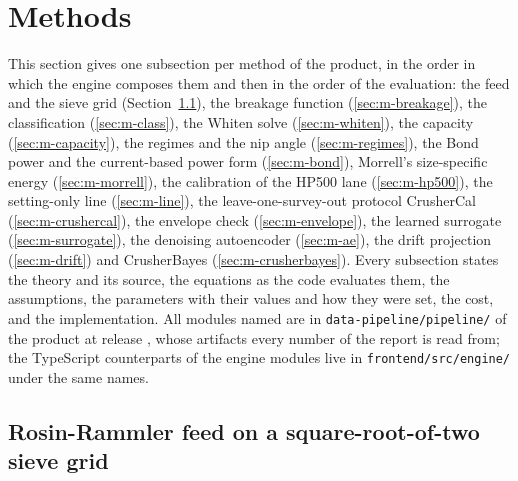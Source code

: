 \section{Methods}\label{sec:methods}

This section gives one subsection per method of the product, in the order in which the engine composes them and then in the order
of the evaluation: the feed and the sieve grid (Section~\ref{sec:m-feed}), the breakage function (\ref{sec:m-breakage}), the
classification (\ref{sec:m-class}), the Whiten solve (\ref{sec:m-whiten}), the capacity (\ref{sec:m-capacity}), the regimes and the
nip angle (\ref{sec:m-regimes}), the Bond power and the current-based power form (\ref{sec:m-bond}), Morrell's size-specific energy
(\ref{sec:m-morrell}), the calibration of the HP500 lane (\ref{sec:m-hp500}), the setting-only line (\ref{sec:m-line}), the
leave-one-survey-out protocol CrusherCal (\ref{sec:m-crushercal}), the envelope check (\ref{sec:m-envelope}), the learned surrogate
(\ref{sec:m-surrogate}), the denoising autoencoder (\ref{sec:m-ae}), the drift projection (\ref{sec:m-drift}) and CrusherBayes
(\ref{sec:m-crusherbayes}). Every subsection states the theory and its source, the equations as the code evaluates them, the
assumptions, the parameters with their values and how they were set, the cost, and the implementation. All modules named are in
\texttt{data-pipeline/\allowbreak{}pipeline/\allowbreak{}} of the product at release \docrelease, whose artifacts every number of the report is read from; the
TypeScript counterparts of the engine modules live in \texttt{frontend/\allowbreak{}src/\allowbreak{}engine/\allowbreak{}} under the same names.

\subsection{Rosin-Rammler feed on a square-root-of-two sieve grid}\label{sec:m-feed}

